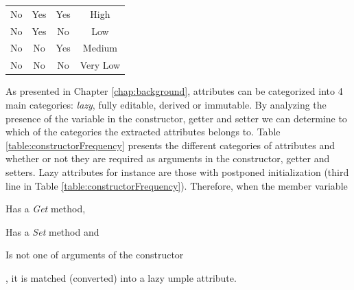 \begin{table}[h]
\begin{tabular}{@{}cccc@{}}
No                                                      & Yes                                                & Yes                                                & High                                                                                                          \\
No                                                      & Yes                                                & No                                                 & Low                                                                                                           \\
No                                                      & No                                                 & Yes                                                & Medium                                                                                                        \\
No                                                      & No                                                 & No                                                 & Very Low                                                                                                      \\ \bottomrule
\end{tabular}
\end{table}

As presented in Chapter \ref{chap:background}, attributes can be categorized into 4 main categories: \textit{lazy}, fully editable, derived or immutable. By analyzing the presence of the variable in the constructor, getter and setter we can determine to which of the categories the extracted attributes belongs to. Table \ref{table:constructorFrequency} presents the different categories of attributes and whether or not they are required as arguments in the constructor, getter and setters. Lazy attributes for instance are those with postponed initialization (third line in Table \ref{table:constructorFrequency}). Therefore, when the member variable 
\begin{enumerate*}
  \item Has a \textit{Get} method,
  \item Has a \textit{Set} method and
  \item Is not one of arguments of the constructor 
\end{enumerate*}, it is matched (converted) into a lazy umple attribute. 

